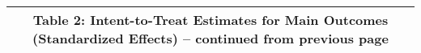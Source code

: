 \begin{longtable}{llcccccccccc}
\multicolumn{12}{c}{{\bfseries Table 2: Intent-to-Treat Estimates for Main Outcomes (Standardized Effects) -- continued from previous page}} \\ \hline                                                                                                                                                                                                                                                                                                                                                                                                                                                                                                                                                                                                                                                                                                                                  

\end{longtable}
